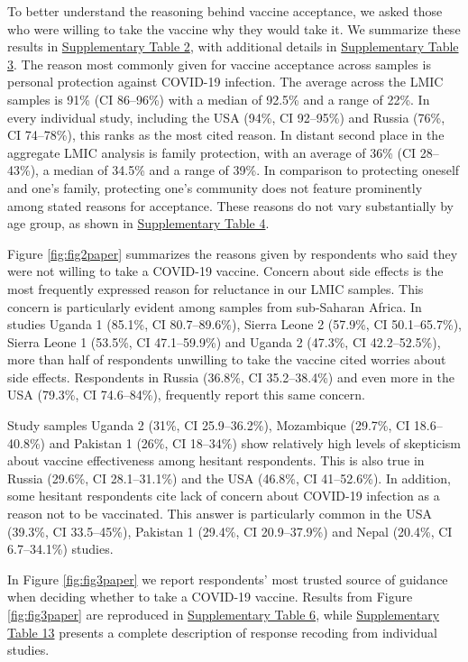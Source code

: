 \documentclass[
  12pt,
]{article}
\begin{document}
To better understand the reasoning behind vaccine acceptance, we asked those who were willing to take the vaccine why they would take it. We summarize these results in \hyperref[tab:yes]{Supplementary Table 2}, with additional details in \hyperref[tab:yesall]{Supplementary Table 3}. The reason most commonly given for vaccine acceptance across samples is personal protection against COVID-19 infection. The average across the LMIC samples is 91\% (CI 86--96\%) with a median of 92.5\% and a range of 22\%. In every individual study, including the USA (94\%, CI 92--95\%) and Russia (76\%, CI 74--78\%), this ranks as the most cited reason. In distant second place in the aggregate LMIC analysis is family protection, with an average of 36\% (CI 28--43\%), a median of 34.5\% and a range of 39\%. In comparison to protecting oneself and one's family, protecting one's community does not feature prominently among stated reasons for acceptance. These reasons do not vary substantially by age group, as shown in \hyperref[tab:yes1]{Supplementary Table 4}.

Figure \ref{fig:fig2paper} summarizes the reasons given by respondents who said they were not willing to take a COVID-19 vaccine. Concern about side effects is the most frequently expressed reason for reluctance in our LMIC samples. This concern is particularly evident among samples from sub-Saharan Africa. In studies Uganda 1 (85.1\%, CI 80.7--89.6\%), Sierra Leone 2 (57.9\%, CI 50.1--65.7\%), Sierra Leone 1 (53.5\%, CI 47.1--59.9\%) and Uganda 2 (47.3\%, CI 42.2--52.5\%), more than half of respondents unwilling to take the vaccine cited worries about side effects. Respondents in Russia (36.8\%, CI 35.2--38.4\%) and even more in the USA (79.3\%, CI 74.6--84\%), frequently report this same concern.

Study samples Uganda 2 (31\%, CI 25.9--36.2\%), Mozambique (29.7\%, CI 18.6--40.8\%) and Pakistan 1 (26\%, CI 18--34\%) show relatively high levels of skepticism about vaccine effectiveness among hesitant respondents. This is also true in Russia (29.6\%, CI 28.1--31.1\%) and the USA (46.8\%, CI 41--52.6\%). In addition, some hesitant respondents cite lack of concern about COVID-19 infection as a reason not to be vaccinated. This answer is particularly common in the USA (39.3\%, CI 33.5--45\%), Pakistan 1 (29.4\%, CI 20.9--37.9\%) and Nepal (20.4\%, CI 6.7--34.1\%) studies.

In Figure \ref{fig:fig3paper} we report respondents' most trusted source of guidance when deciding whether to take a COVID-19 vaccine. Results from Figure \ref{fig:fig3paper} are reproduced in \hyperref[tab:trust]{Supplementary Table 6}, while \hyperref[tab:q4]{Supplementary Table 13} presents a complete description of response recoding from individual studies.
\end{document}
